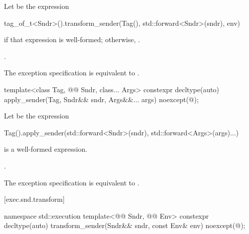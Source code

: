 \begin{itemdescr}
\pnum
Let  be the expression
\begin{codeblock}
tag_of_t<Sndr>().transform_sender(Tag(), std::forward<Sndr>(sndr), env)
\end{codeblock}
if that expression is well-formed;
otherwise, .

\pnum
\returns
{}.

\pnum
\remarks
The exception specification is equivalent to .
\end{itemdescr}

%
\begin{itemdecl}
template<class Tag, @@ Sndr, class... Args>
  constexpr decltype(auto) apply_sender(Tag, Sndr&& sndr, Args&&... args)
    noexcept(@\seebelow@);
\end{itemdecl}

\begin{itemdescr}
\pnum
Let  be the expression
\begin{codeblock}
  Tag().apply_sender(std::forward<Sndr>(sndr), std::forward<Args>(args)...)
\end{codeblock}

\pnum
\constraints
{} is a well-formed expression.

\pnum
\returns
{}.

\pnum
\remarks
The exception specification is equivalent to .
\end{itemdescr}

[exec.snd.transform]{}

%
\begin{itemdecl}
namespace std::execution {
  template<@@ Sndr, @@ Env>
    constexpr decltype(auto) transform_sender(Sndr&& sndr, const Env& env)
      noexcept(@\seebelow@);
}
\end{itemdecl}

